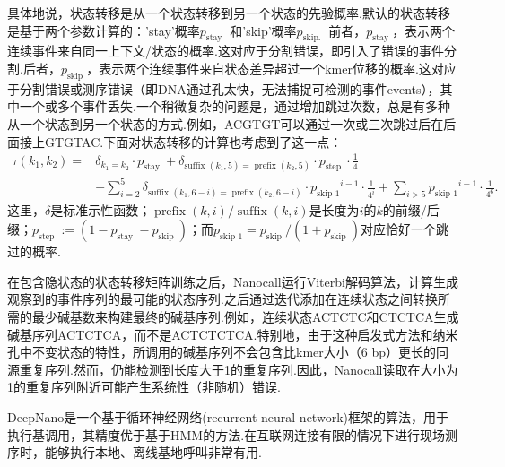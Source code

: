 具体地说，状态转移是从一个状态转移到另一个状态的先验概率.默认的状态转移是基于两个参数计算的：'stay'概率$p_{\text {stay }}$ 和'skip'概率$p_{\text {skip. }}$ 前者，$p_{\text {stay }}$，表示两个连续事件来自同一上下文/状态的概率.这对应于分割错误，即引入了错误的事件分割.后者，$p_{\text {skip }}$，表示两个连续事件来自状态差异超过一个kmer位移的概率.这对应于分割错误或测序错误（即DNA通过孔太快，无法捕捉可检测的事件events），其中一个或多个事件丢失.一个稍微复杂的问题是，通过增加跳过次数，总是有多种从一个状态到另一个状态的方式.例如，ACGTGT可以通过一次或三次跳过后在后面接上GTGTAC.下面对状态转移的计算也考虑到了这一点：
$$
\begin{aligned}
	\tau\left(k_1, k_2\right)= & \delta_{k_1=k_2} \cdot p_{\text {stay }} 
	 +\delta_{\text {suffix }\left(k_1, 5\right)=\operatorname{prefix}\left(k_2, 5\right)} \cdot p_{\text {step }} \cdot \frac{1}{4} \\
	& +\sum_{i=2}^5 \delta_{\text {suffix }\left(k_1, 6-i\right)=\operatorname{prefix}\left(k_2, 6-i\right)} \cdot p_{\text {skip } 1}{ }^{i-1} \cdot \frac{1}{4^i} 
	 +\sum_{i>5} p_{\text {skip } 1}{ }^{i-1} \cdot \frac{1}{4^6} .
\end{aligned}
$$
这里，$\delta$是标准示性函数；$\operatorname{prefix}(k, i) / \operatorname{suffix}(k, i)$是长度为$i$的$k$的前缀/后缀；$p_{\text {step }}:=\left(1-p_{\text {stay }}-p_{\text {skip }}\right)$；而$p_{\text {skip } 1}=p_{\text {skip }} /\left(1+p_{\text {skip }}\right)$对应恰好一个跳过的概率.


在包含隐状态的状态转移矩阵训练之后，Nanocall运行Viterbi解码算法，计算生成观察到的事件序列的最可能的状态序列.之后通过迭代添加在连续状态之间转换所需的最少碱基数来构建最终的碱基序列.例如，连续状态ACTCTC和CTCTCA生成碱基序列ACTCTCA，而不是ACTCTCTCA.特别地，由于这种启发式方法和纳米孔中不变状态的特性，所调用的碱基序列不会包含比kmer大小（6 bp）更长的同源重复序列.然而，仍能检测到长度大于1的重复序列.因此，Nanocall读取在大小为1的重复序列附近可能产生系统性（非随机）错误.

DeepNano\cite{bovza2017deepnano}是一个基于循环神经网络(recurrent neural network)\cite{giles1994dynamic}框架的算法，用于执行基调用，其精度优于基于HMM的方法.在互联网连接有限的情况下进行现场测序时，能够执行本地、离线基地呼叫非常有用.

